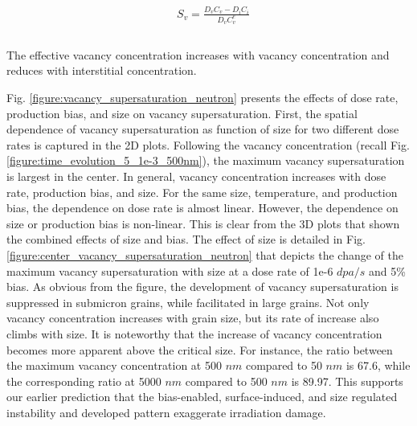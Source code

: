 \documentclass[utf8]{frontiersSCNS} %
\begin{document}
    \begin{equation}
        \begin{aligned}
        &S_v=\frac{D_vC_v-D_iC_i}{D_vC_v^e}\\
        \end{aligned}
    \end{equation}\\
    The effective vacancy concentration increases with vacancy concentration and reduces with interstitial concentration. 
    
    Fig. \ref{figure:vacancy_supersaturation_neutron} presents the effects of dose rate, production bias, and size on vacancy supersaturation. First, the spatial dependence of vacancy supersaturation as function of size for two different dose rates is captured in the 2D plots. Following the vacancy concentration (recall Fig. \ref{figure:time_evolution_5_1e-3_500nm}), the maximum vacancy supersaturation is largest in the center. In general, vacancy concentration increases with dose rate, production bias, and size. For the same size, temperature, and production bias, the dependence on dose rate is almost linear. However, the dependence on size or production bias is non-linear. This is clear from the 3D plots that shown the combined effects of size and bias. The effect of size is detailed in Fig. \ref{figure:center_vacancy_supersaturation_neutron} that depicts the change of the maximum vacancy supersaturation with size at a dose rate of 1e-6 $dpa/s$ and 5\% bias. As obvious from the figure, the development of vacancy supersaturation is suppressed in submicron grains, while facilitated in large grains. Not only vacancy concentration increases with grain size, but its rate of increase also climbs with size. It is noteworthy that the increase of vacancy concentration becomes more apparent above the critical size. For instance, the ratio between the maximum vacancy concentration at 500 $nm$ compared to 50 $nm$ is 67.6, while the corresponding ratio at 5000 $nm$ compared to 500 $nm$ is 89.97. This supports our earlier prediction that the bias-enabled, surface-induced, and size regulated instability and developed pattern exaggerate irradiation damage.     
\end{document}
